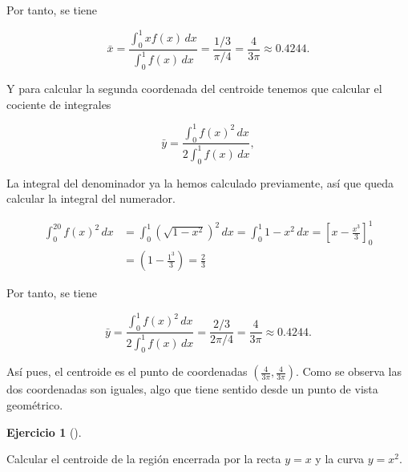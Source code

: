 \documentclass[
  spanish,
  a4paper,
]{scrreport}
\theoremstyle{definition}
\newtheorem{exercise}{Ejercicio}[chapter]
\theoremstyle{remark}
\begin{document}
\begin{tcolorbox}
Por tanto, se tiene

\[
\bar x = \frac{\int_0^{1} x f(x)\,dx}{\int_0^{1}f(x)\,dx}
= \frac{1/3}{\pi/4} 
= \frac{4}{3\pi}
\approx 0.4244.
\]

Y para calcular la segunda coordenada del centroide tenemos que calcular
el cociente de integrales

\[
\bar y = \frac{\int_0^1 f(x)^2\,dx}{2\int_0^1f(x)\,dx}, 
\]

La integral del denominador ya la hemos calculado previamente, así que
queda calcular la integral del numerador.

\begin{align*}
\int_0^{20} f(x)^2\,dx 
&= \int_0^1 (\sqrt{1-x^2})^2 \,dx
= \int_0^1 1-x^2 \,dx
= \left[x-\frac{x^3}{3}\right]_0^1 \\
&= \left(1-\frac{1^3}{3}\right) 
= \frac{2}{3}
\end{align*}

Por tanto, se tiene

\[
\bar y = \frac{\int_0^1 f(x)^2\,dx}{2\int_0^1f(x)\,dx}
= \frac{2/3}{2\pi/4}
= \frac{4}{3\pi}
\approx 0.4244.
\]

Así pues, el centroide es el punto de coordenadas
\(\left(\frac{4}{3\pi}, \frac{4}{3\pi}\right)\). Como se observa las dos
coordenadas son iguales, algo que tiene sentido desde un punto de vista
geométrico.

\end{tcolorbox}

\begin{exercise}[]\protect\hypertarget{exr-centro-masas-3}{}\label{exr-centro-masas-3}

Calcular el centroide de la región encerrada por la recta \(y=x\) y la
curva \(y=x^2\).

\end{exercise}
\end{document}
